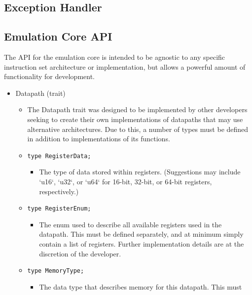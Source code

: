 \documentclass[parskip=half, fontsize=12pt]{scrartcl}
\providecommand{\tightlist}{%
  \setlength{\itemsep}{0pt}\setlength{\parskip}{0pt}}
\begin{document}
\subsection{Exception Handler}


\subsection{Emulation Core API}
\label{subsec:emulation-core-api}

The API for the emulation core is intended to be agnostic to any
specific instruction set architecture or implementation, but allows a
powerful amount of functionality for development.

\begin{itemize}
    \tightlist
    \item Datapath (trait)
    \begin{itemize}
        \tightlist
        \item The Datapath trait was designed to be implemented by other
            developers seeking to create their own implementations of datapaths
            that may use alternative architectures. Due to this, a number of
            types must be defined in addition to implementations of its
            functions.
        \item \texttt{type RegisterData;}
        \begin{itemize}
            \tightlist
                \item The type of data stored within registers. (Suggestions may include
                `u16`, `u32`, or `u64` for 16-bit, 32-bit, or 64-bit registers,
                respectively.)
        \end{itemize}
        \item \texttt{type RegisterEnum;}
        \begin{itemize}
            \tightlist
            \item The enum used to describe all available registers used in the
            datapath. This must be defined separately, and at minimum simply
            contain a list of registers. Further implementation details are at
            the discretion of the developer.
        \end{itemize}
        \item \texttt{type MemoryType;}
        \begin{itemize}
            \tightlist
            \item The data type that describes memory for this datapath. This must

\end{itemize}
\end{itemize}
\end{itemize}
\end{document}
